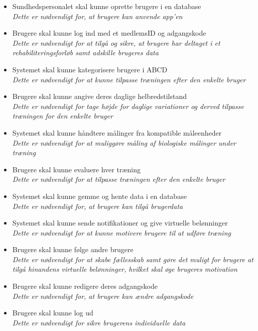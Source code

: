 \noindent 
\begin{itemize}
\item Sundhedspersonalet skal kunne oprette brugere i en database
	\\
	\textit{Dette er nødvendigt for, at brugere kan anvende app'en}
\item Brugere skal kunne log ind med et medlemsID og adgangskode
	\\
	\textit{Dette er nødvendigt for at tilgå og sikre, at brugere har deltaget i et rehabiliteringsforløb samt adskille brugeres data}
\item Systemet skal kunne kategorisere brugere i ABCD
	\\
	\textit{Dette er nødvendigt for at kunne tilpasse træningen efter den enkelte bruger}
\item Brugere skal kunne angive deres daglige helbredstilstand 
	\\
\textit{Dette er nødvendigt for tage højde for daglige variationer og derved tilpasse træningen for den enkelte bruger}
\item Systemet skal kunne håndtere målinger fra kompatible måleenheder
	\\
\textit{Dette er nødvendigt for at muliggøre måling af biologiske målinger under træning}
\item Brugere skal kunne evaluere hver træning
	\\
\textit{Dette er nødvendigt for at tilpasse træningen efter den enkelte bruger}	
\item Systemet skal kunne gemme og hente data i en database
\\
\textit{Dette er nødvendigt for, at brugere kan tilgå brugerdata}	
\item Systemet skal kunne sende notifikationer og give virtuelle belønninger 
	\\
	\textit{Dette er nødvendigt for at kunne motivere brugere til at udføre træning}
\item Brugere skal kunne følge andre brugere
	\\
	\textit{Dette er nødvendigt for at skabe fællesskab samt gøre det muligt for brugere at tilgå hinandens virtuelle belønninger, hvilket skal øge brugeres motivation}
\item Brugere skal kunne redigere deres adgangskode
	\\
	\textit{Dette er nødvendigt for, at brugere kan ændre adgangskode}
\item Brugere skal kunne log ud
	\\
	\textit{Dette er nødvendigt for sikre brugerens individuelle data}
\end{itemize}


